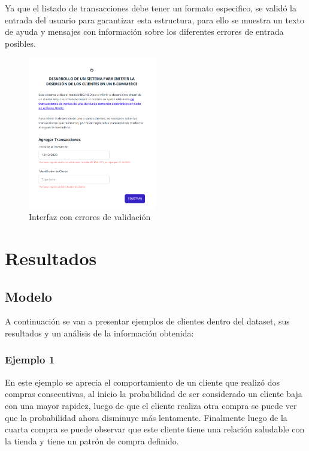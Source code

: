 Ya que el listado de transacciones debe tener un formato especifico, se validó la entrada del usuario para garantizar esta estructura, para ello se muestra un texto de ayuda y mensajes con información sobre los diferentes errores de entrada posibles.

\begin{figure}[H]
	\centering \includegraphics[width=0.50\textwidth]{images/6.png}
	\caption{Interfaz con errores de validación}
	\label{fig:ui1}
\end{figure}

\section{Resultados}

\subsection{Modelo}

A continuación se van a presentar ejemplos de clientes dentro del dataset, sus resultados y un análisis de la información obtenida:

\subsubsection{Ejemplo 1}

En este ejemplo se aprecia el comportamiento de un cliente que realizó dos compras consecutivas, al inicio la probabilidad de ser considerado un cliente baja con una mayor rapidez, luego de que el cliente realiza otra compra se puede ver que la probabilidad ahora disminuye más lentamente. Finalmente luego de la cuarta compra se puede observar que este cliente tiene una relación saludable con la tienda y tiene un patrón de compra definido.

